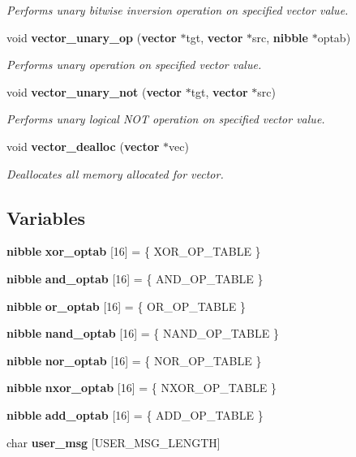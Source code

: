 \begin{CompactItemize}
\begin{CompactList}\small\item\em Performs unary bitwise inversion operation on specified vector value. \item\end{CompactList}\item 
void {\bf vector\_\-unary\_\-op} ({\bf vector} $\ast$tgt, {\bf vector} $\ast$src, {\bf nibble} $\ast$optab)
\begin{CompactList}\small\item\em Performs unary operation on specified vector value. \item\end{CompactList}\item 
void {\bf vector\_\-unary\_\-not} ({\bf vector} $\ast$tgt, {\bf vector} $\ast$src)
\begin{CompactList}\small\item\em Performs unary logical NOT operation on specified vector value. \item\end{CompactList}\item 
void {\bf vector\_\-dealloc} ({\bf vector} $\ast$vec)
\begin{CompactList}\small\item\em Deallocates all memory allocated for vector. \item\end{CompactList}\end{CompactItemize}
\subsection*{Variables}
\begin{CompactItemize}
\item 
{\bf nibble} {\bf xor\_\-optab} [16] = \{ XOR\_\-OP\_\-TABLE \}
\item 
{\bf nibble} {\bf and\_\-optab} [16] = \{ AND\_\-OP\_\-TABLE \}
\item 
{\bf nibble} {\bf or\_\-optab} [16] = \{ OR\_\-OP\_\-TABLE \}
\item 
{\bf nibble} {\bf nand\_\-optab} [16] = \{ NAND\_\-OP\_\-TABLE \}
\item 
{\bf nibble} {\bf nor\_\-optab} [16] = \{ NOR\_\-OP\_\-TABLE \}
\item 
{\bf nibble} {\bf nxor\_\-optab} [16] = \{ NXOR\_\-OP\_\-TABLE \}
\item 
{\bf nibble} {\bf add\_\-optab} [16] = \{ ADD\_\-OP\_\-TABLE \}
\item 
char {\bf user\_\-msg} [USER\_\-MSG\_\-LENGTH]
\end{CompactItemize}


